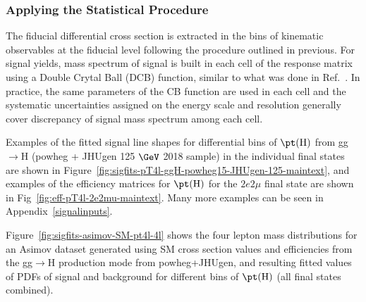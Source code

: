 \subsubsection{Applying the Statistical Procedure} \label{sec:SignalDifferential}
The fiducial differential cross section is extracted in the bins of kinematic observables at the fiducial level following the procedure outlined in previous. 
For signal yields, mass spectrum of signal is built in each cell of the response matrix using a Double Crytal Ball (DCB) function, similar to what was done in Ref.~\cite{Chatrchyan:2013mxa}.
In practice, the same parameters of the CB function are used in each cell and the systematic uncertainties assigned on the energy scale and resolution generally cover discrepancy of signal mass spectrum among each cell.
\par
Examples of the fitted signal line shapes for differential bins of $\pt({\rm H})$ from gg$\rightarrow$H ({\sc powheg + JHUgen} 125 $\GeV$ 2018 sample) in the individual
final states are shown in Figure~\ref{fig:sigfits-pT4l-ggH-powheg15-JHUgen-125-maintext}, and examples of the efficiency matrices for $\pt({\rm H})$ for the
$2e2\mu$ final state are shown in Fig~\ref{fig:eff-pT4l-2e2mu-maintext}. Many more examples can be seen in Appendix~\ref{signalinputs}.

Figure~\ref{fig:sigfits-asimov-SM-pt4l-4l} shows the four lepton mass distributions for an Asimov dataset generated using SM cross section values and efficiencies
from the gg$\rightarrow$H production mode from {\sc powheg+JHUgen}, and resulting fitted values of PDFs of signal and background for different bins of $\pt(\mathrm{H})$ (all final states combined).

